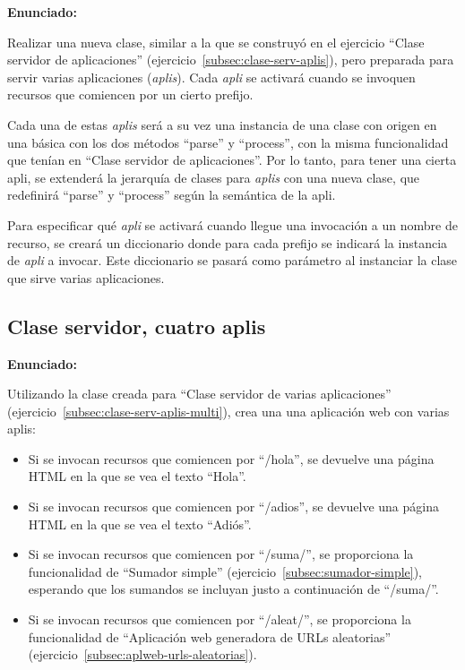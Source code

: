 \textbf{Enunciado:}

Realizar una nueva clase, similar a la que se construyó en el ejercicio ``Clase servidor de aplicaciones'' (ejercicio~\ref{subsec:clase-serv-aplis}), pero preparada para servir varias aplicaciones (\emph{aplis}). Cada \emph{apli} se activará cuando se invoquen recursos que comiencen por un cierto prefijo.

Cada una de estas \emph{aplis} será a su vez una instancia de una clase con origen en una básica con los dos métodos ``parse'' y ``process'', con la misma funcionalidad que tenían en ``Clase servidor de aplicaciones''. Por lo tanto, para tener una cierta apli, se extenderá la jerarquía de clases para \emph{aplis} con una nueva clase, que redefinirá ``parse'' y ``process'' según la semántica de la apli.

Para especificar qué \emph{apli} se activará cuando llegue una invocación a un nombre de recurso, se creará un diccionario donde para cada prefijo se indicará la instancia de \emph{apli} a invocar. Este diccionario se pasará como parámetro al instanciar la clase que sirve varias aplicaciones.

\subsection{Clase servidor, cuatro aplis}
\label{subsec:clase-serv-aplis-varias}

\textbf{Enunciado:}

Utilizando la clase creada para ``Clase servidor de varias aplicaciones'' (ejercicio~\ref{subsec:clase-serv-aplis-multi}), crea una una aplicación web con varias aplis:

\begin{itemize}
\item Si se invocan recursos que comiencen por ``/hola'', se devuelve una página HTML en la que se vea el texto ``Hola''.
\item Si se invocan recursos que comiencen por ``/adios'', se devuelve una página HTML en la que se vea el texto ``Adiós''.
\item Si se invocan recursos que comiencen por ``/suma/'', se proporciona la funcionalidad de ``Sumador simple'' (ejercicio~\ref{subsec:sumador-simple}), esperando que los sumandos se incluyan justo a continuación de ``/suma/''.
\item Si se invocan recursos que comiencen por ``/aleat/'', se proporciona la funcionalidad de ``Aplicación web generadora de URLs aleatorias'' (ejercicio~\ref{subsec:aplweb-urls-aleatorias}).
\end{itemize}

